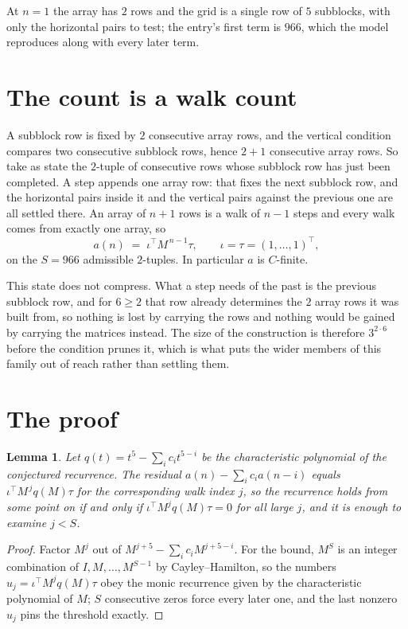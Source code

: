 \documentclass[11pt,a4paper]{article}
\theoremstyle{plain}
\newtheorem{lemma}[theorem]{Lemma}
\theoremstyle{definition}
\begin{document}
At $n=1$ the array has $2$ rows and the grid is a single row of $5$
subblocks, with only the horizontal pairs to test; the entry's first term is
$966$, which the model reproduces along with every later term.

\section{The count is a walk count}

A subblock row is fixed by $2$ consecutive array rows, and the vertical condition compares
two consecutive subblock rows, hence $2+1$ consecutive array rows. So take as state the
$2$-tuple of consecutive rows whose subblock row has just been completed. A step appends one
array row: that fixes the next subblock row, and the horizontal pairs inside it and the
vertical pairs against the previous one are all settled there. An array of $n+1$ rows is
a walk of $n-1$ steps and every walk comes from exactly one array, so
\[
a(n)\;=\;\iota^{\!\top}M^{\,n-1}\tau,\qquad\iota=\tau=(1,\dots,1)^{\!\top},
\]
on the $S=966$ admissible $2$-tuples. In particular $a$ is $C$-finite.

This state does not compress. What a step needs of the past is the previous subblock row, and
for $6\ge2$ that row already determines the $2$ array rows it was built from, so nothing
is lost by carrying the rows and nothing would be gained by carrying the matrices instead. The
size of the construction is therefore $3^{2\cdot6}$ before the condition prunes
it, which is what puts the wider members of this family out of reach rather than settling them.

\section{The proof}

\begin{lemma}\label{lem:crit}
Let $q(t)=t^{5}-\sum_i c_it^{5-i}$ be the characteristic polynomial of the
conjectured recurrence. The residual $a(n)-\sum_ic_ia(n-i)$ equals
$\iota^{\!\top}M^{\,j}q(M)\tau$ for the corresponding walk index $j$, so the recurrence
holds from some point on if and only if $\iota^{\!\top}M^{j}q(M)\tau=0$ for all large $j$,
and it is enough to examine $j<S$.
\end{lemma}

\begin{proof}
Factor $M^{j}$ out of $M^{j+5}-\sum_ic_iM^{j+5-i}$. For the bound, $M^{S}$
is an integer combination of $I,M,\dots,M^{S-1}$ by Cayley--Hamilton, so the numbers
$u_j=\iota^{\!\top}M^{j}q(M)\tau$ obey the monic recurrence given by the characteristic
polynomial of $M$; $S$ consecutive zeros force every later one, and the last nonzero $u_j$
pins the threshold exactly.
\end{proof}
\end{document}
